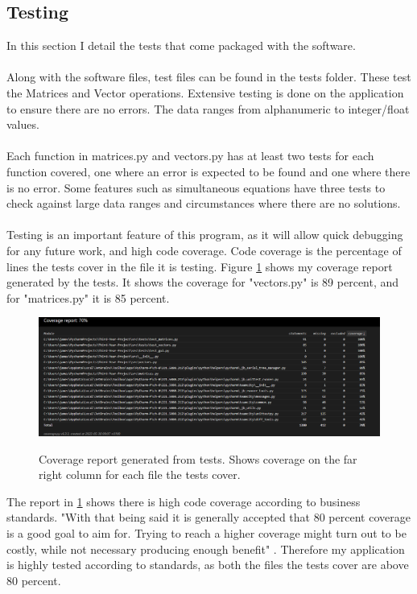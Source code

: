 \documentclass[final]{cmpreport}
\begin{document}
	
	\subsection{Testing} \label{sec:test}
	
	In this section I detail the tests that come packaged with the software.\\
	\\Along with the software files, test files can be found in the tests folder. These test the Matrices and Vector operations. Extensive testing is done on the application to ensure there are no errors. The data ranges from alphanumeric to integer/float values.\\
	\\Each function in matrices.py and vectors.py has at least two tests for each function covered, one where an error is expected to be found and one where there is no error. Some features such as simultaneous equations have three tests to check against large data ranges and circumstances where there are no solutions.\\
	\\Testing is an important feature of this program, as it will allow quick debugging for any future work, and high code coverage. Code coverage is the percentage of lines the tests cover in the file it is testing. Figure \ref{fig:coverage} shows my coverage report generated by the tests. It shows the coverage for "vectors.py" is 89 percent, and for "matrices.py" it is 85 percent.
	\begin{figure}[H]
		\caption{Coverage report generated from tests. Shows coverage on the far right column for each file the tests cover.}
		\centering
		\includegraphics[scale=0.4]{coverage.png}
		\label{fig:coverage}
	\end{figure}
	The report in \ref{fig:coverage} shows there is high code coverage according to business standards. "With that being said it is generally accepted that 80 percent coverage is a good goal to aim for. Trying to reach a higher coverage might turn out to be costly, while not necessary producing enough benefit" \cite{atlassian}. Therefore my application is highly tested according to standards, as both the files the tests cover are above 80 percent.
	
\end{document}
